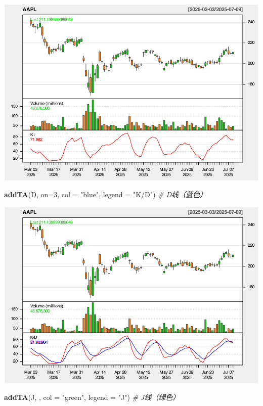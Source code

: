 \documentclass[]{ctexbook}
\newenvironment{Shaded}{\begin{snugshade}}{\end{snugshade}}
\newcommand{\AttributeTok}[1]{\textcolor[rgb]{0.13,0.29,0.53}{#1}}
\newcommand{\CommentTok}[1]{\textcolor[rgb]{0.56,0.35,0.01}{\textit{#1}}}
\newcommand{\DecValTok}[1]{\textcolor[rgb]{0.00,0.00,0.81}{#1}}
\newcommand{\FunctionTok}[1]{\textcolor[rgb]{0.13,0.29,0.53}{\textbf{#1}}}
\newcommand{\NormalTok}[1]{#1}
\newcommand{\StringTok}[1]{\textcolor[rgb]{0.31,0.60,0.02}{#1}}
\begin{document}
\includegraphics[width=0.9\linewidth]{quantmod_files/figure-latex/kdj_2-2}

\begin{Shaded}
\begin{Highlighting}[]
\FunctionTok{addTA}\NormalTok{(D, }\AttributeTok{on=}\DecValTok{3}\NormalTok{, }\AttributeTok{col =} \StringTok{"blue"}\NormalTok{, }\AttributeTok{legend =} \StringTok{"K/D"}\NormalTok{)   }\CommentTok{\# D线（蓝色）}
\end{Highlighting}
\end{Shaded}

\includegraphics[width=0.9\linewidth]{quantmod_files/figure-latex/kdj_2-3}

\begin{Shaded}
\begin{Highlighting}[]
\FunctionTok{addTA}\NormalTok{(J, , }\AttributeTok{col =} \StringTok{"green"}\NormalTok{, }\AttributeTok{legend =} \StringTok{"J"}\NormalTok{)  }\CommentTok{\# J线（绿色）}
\end{Highlighting}
\end{Shaded}
\end{document}

